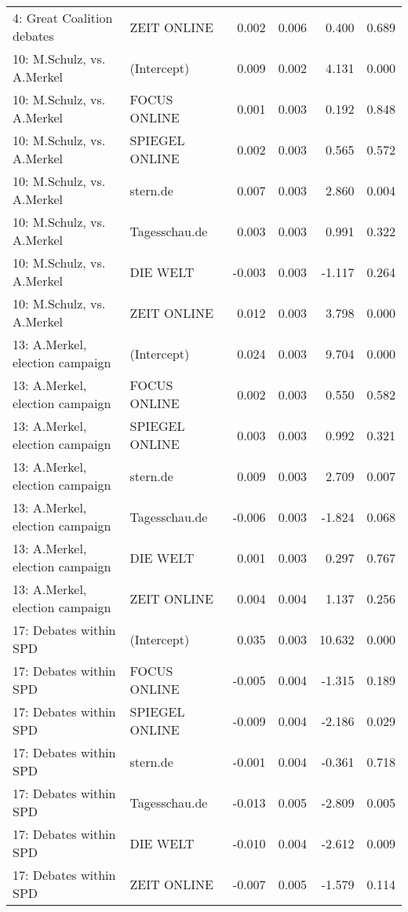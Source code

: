 \begin{adjustbox}{width=\textwidth,totalheight=\textheight,keepaspectratio}
\begin{tabular}{llrrrr}
  4: Great Coalition debates & ZEIT ONLINE & 0.002 & 0.006 & 0.400 & 0.689 \\ 
  10: M.Schulz, vs. A.Merkel & (Intercept) & 0.009 & 0.002 & 4.131 & 0.000 \\ 
  10: M.Schulz, vs. A.Merkel & FOCUS ONLINE & 0.001 & 0.003 & 0.192 & 0.848 \\ 
  10: M.Schulz, vs. A.Merkel & SPIEGEL ONLINE & 0.002 & 0.003 & 0.565 & 0.572 \\ 
  10: M.Schulz, vs. A.Merkel & stern.de & 0.007 & 0.003 & 2.860 & 0.004 \\ 
  10: M.Schulz, vs. A.Merkel & Tagesschau.de & 0.003 & 0.003 & 0.991 & 0.322 \\ 
  10: M.Schulz, vs. A.Merkel & DIE WELT & -0.003 & 0.003 & -1.117 & 0.264 \\ 
  10: M.Schulz, vs. A.Merkel & ZEIT ONLINE & 0.012 & 0.003 & 3.798 & 0.000 \\ 
  13: A.Merkel, election campaign & (Intercept) & 0.024 & 0.003 & 9.704 & 0.000 \\ 
  13: A.Merkel, election campaign & FOCUS ONLINE & 0.002 & 0.003 & 0.550 & 0.582 \\ 
  13: A.Merkel, election campaign & SPIEGEL ONLINE & 0.003 & 0.003 & 0.992 & 0.321 \\ 
  13: A.Merkel, election campaign & stern.de & 0.009 & 0.003 & 2.709 & 0.007 \\ 
  13: A.Merkel, election campaign & Tagesschau.de & -0.006 & 0.003 & -1.824 & 0.068 \\ 
  13: A.Merkel, election campaign & DIE WELT & 0.001 & 0.003 & 0.297 & 0.767 \\ 
  13: A.Merkel, election campaign & ZEIT ONLINE & 0.004 & 0.004 & 1.137 & 0.256 \\ 
  17: Debates within SPD & (Intercept) & 0.035 & 0.003 & 10.632 & 0.000 \\ 
  17: Debates within SPD & FOCUS ONLINE & -0.005 & 0.004 & -1.315 & 0.189 \\ 
  17: Debates within SPD & SPIEGEL ONLINE & -0.009 & 0.004 & -2.186 & 0.029 \\ 
  17: Debates within SPD & stern.de & -0.001 & 0.004 & -0.361 & 0.718 \\ 
  17: Debates within SPD & Tagesschau.de & -0.013 & 0.005 & -2.809 & 0.005 \\ 
  17: Debates within SPD & DIE WELT & -0.010 & 0.004 & -2.612 & 0.009 \\ 
  17: Debates within SPD & ZEIT ONLINE & -0.007 & 0.005 & -1.579 & 0.114 \\ 

\end{tabular}
\end{adjustbox}
